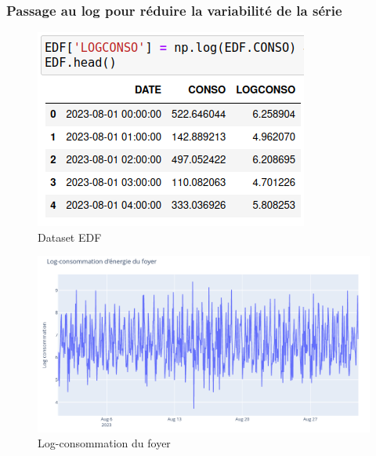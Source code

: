 \documentclass{beamer}
\theoremstyle{definition}
\begin{document}
\begin{frame}
\begin{minipage}[c]{1\linewidth}
\begin{minipage}[c]{0.5\linewidth}
\begin{figure}
		\end{figure}\end{minipage}
	\end{minipage}	
\end{frame}

\begin{frame}
	\frametitle{Passage au log pour réduire la variabilité de la série}
	\begin{minipage}[c]{1\linewidth}
		\begin{minipage}[c]{0.4\linewidth}\centering\begin{figure}
				\centering
				\includegraphics[width=1\linewidth]{4.png}
				\caption*{Dataset EDF}
		\end{figure}\end{minipage}\hfill 
		\begin{minipage}[c]{0.58\linewidth}\centering\begin{figure}
				\begin{center}
					\includegraphics[width=1\linewidth]{5.png}			
					\caption*{Log-consommation du foyer}
				\end{center}
				
		\end{figure}\end{minipage}
	\end{minipage}
	
\end{frame}
\end{document}
